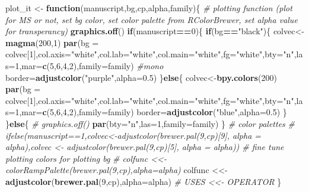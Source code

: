 \documentclass[10,portrait]{article}
\newenvironment{Shaded}{\begin{snugshade}}{\end{snugshade}}
\newcommand{\KeywordTok}[1]{\textcolor[rgb]{0.13,0.29,0.53}{\textbf{#1}}}
\newcommand{\DataTypeTok}[1]{\textcolor[rgb]{0.13,0.29,0.53}{#1}}
\newcommand{\DecValTok}[1]{\textcolor[rgb]{0.00,0.00,0.81}{#1}}
\newcommand{\FloatTok}[1]{\textcolor[rgb]{0.00,0.00,0.81}{#1}}
\newcommand{\StringTok}[1]{\textcolor[rgb]{0.31,0.60,0.02}{#1}}
\newcommand{\CommentTok}[1]{\textcolor[rgb]{0.56,0.35,0.01}{\textit{#1}}}
\newcommand{\ControlFlowTok}[1]{\textcolor[rgb]{0.13,0.29,0.53}{\textbf{#1}}}
\newcommand{\OperatorTok}[1]{\textcolor[rgb]{0.81,0.36,0.00}{\textbf{#1}}}
\newcommand{\NormalTok}[1]{#1}
\begin{document}
\begin{Shaded}
\begin{Highlighting}[]
\NormalTok{plot_it <-}\StringTok{ }\ControlFlowTok{function}\NormalTok{(manuscript,bg,cp,alpha,family)\{ }\CommentTok{# plotting function (plot for MS or not, set bg color, set color palette from RColorBrewer, set alpha value for transperancy) }
  \KeywordTok{graphics.off}\NormalTok{()}
  \ControlFlowTok{if}\NormalTok{(manuscript}\OperatorTok{==}\DecValTok{0}\NormalTok{)\{}
    \ControlFlowTok{if}\NormalTok{(bg}\OperatorTok{==}\StringTok{"black"}\NormalTok{)\{}
\NormalTok{      colvec<-}\KeywordTok{magma}\NormalTok{(}\DecValTok{200}\NormalTok{,}\DecValTok{1}\NormalTok{)}
      \KeywordTok{par}\NormalTok{(}\DataTypeTok{bg =}\NormalTok{ colvec[}\DecValTok{1}\NormalTok{],}\DataTypeTok{col.axis=}\StringTok{"white"}\NormalTok{,}\DataTypeTok{col.lab=}\StringTok{"white"}\NormalTok{,}\DataTypeTok{col.main=}\StringTok{"white"}\NormalTok{,}\DataTypeTok{fg=}\StringTok{"white"}\NormalTok{,}\DataTypeTok{bty=}\StringTok{"n"}\NormalTok{,}\DataTypeTok{las=}\DecValTok{1}\NormalTok{,}\DataTypeTok{mar=}\KeywordTok{c}\NormalTok{(}\DecValTok{5}\NormalTok{,}\DecValTok{6}\NormalTok{,}\DecValTok{4}\NormalTok{,}\DecValTok{2}\NormalTok{),}\DataTypeTok{family=}\NormalTok{family) }\CommentTok{#mono}
\NormalTok{      border=}\KeywordTok{adjustcolor}\NormalTok{(}\StringTok{"purple"}\NormalTok{,}\DataTypeTok{alpha=}\FloatTok{0.5}\NormalTok{)}
\NormalTok{    \}}\ControlFlowTok{else}\NormalTok{\{}
\NormalTok{      colvec<-}\KeywordTok{bpy.colors}\NormalTok{(}\DecValTok{200}\NormalTok{)}
      \KeywordTok{par}\NormalTok{(}\DataTypeTok{bg =}\NormalTok{ colvec[}\DecValTok{1}\NormalTok{],}\DataTypeTok{col.axis=}\StringTok{"white"}\NormalTok{,}\DataTypeTok{col.lab=}\StringTok{"white"}\NormalTok{,}\DataTypeTok{col.main=}\StringTok{"white"}\NormalTok{,}\DataTypeTok{fg=}\StringTok{"white"}\NormalTok{,}\DataTypeTok{bty=}\StringTok{"n"}\NormalTok{,}\DataTypeTok{las=}\DecValTok{1}\NormalTok{,}\DataTypeTok{mar=}\KeywordTok{c}\NormalTok{(}\DecValTok{5}\NormalTok{,}\DecValTok{6}\NormalTok{,}\DecValTok{4}\NormalTok{,}\DecValTok{2}\NormalTok{),}\DataTypeTok{family=}\NormalTok{family) }
\NormalTok{      border=}\KeywordTok{adjustcolor}\NormalTok{(}\StringTok{"blue"}\NormalTok{,}\DataTypeTok{alpha=}\FloatTok{0.5}\NormalTok{)}
\NormalTok{    \}}
\NormalTok{  \}}\ControlFlowTok{else}\NormalTok{\{}
\CommentTok{#    graphics.off()}
    \KeywordTok{par}\NormalTok{(}\DataTypeTok{bty=}\StringTok{"n"}\NormalTok{,}\DataTypeTok{las=}\DecValTok{1}\NormalTok{,}\DataTypeTok{family=}\NormalTok{family) }
\NormalTok{  \}}
  \CommentTok{# color palettes}
  \CommentTok{# ifelse(manuscript==1,colvec<-adjustcolor(brewer.pal(9,cp)[9], alpha = alpha),colvec <- adjustcolor(brewer.pal(9,cp)[5], alpha = alpha)) # fine tune plotting colors for plotting bg}
   \CommentTok{# colfunc <<- colorRampPalette(brewer.pal(9,cp),alpha=alpha)}
\NormalTok{  colfunc <<-}\StringTok{ }\KeywordTok{adjustcolor}\NormalTok{(}\KeywordTok{brewer.pal}\NormalTok{(}\DecValTok{9}\NormalTok{,cp),}\DataTypeTok{alpha=}\NormalTok{alpha) }\CommentTok{# USES <<- OPERATOR}
\NormalTok{\}}


\end{Highlighting}
\end{Shaded}
\end{document}
